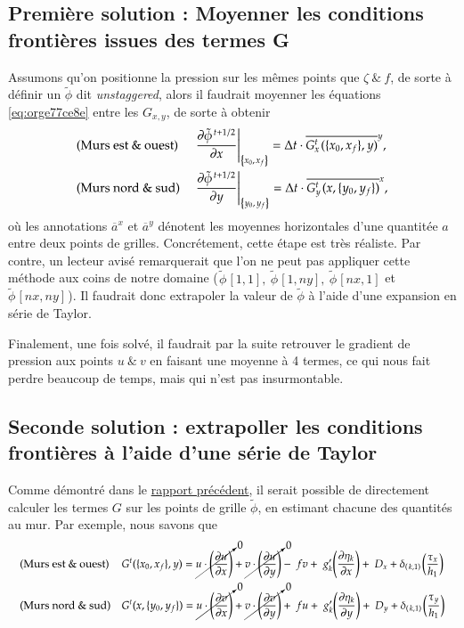 \documentclass[10pt]{article}
\numberwithin{equation}{section}
\newcommand{\pt}{\hspace{1pt}}
\newcommand{\xmean}[1]{\overline{#1}^x}
\newcommand{\ymean}[1]{\overline{#1}^y}
\begin{document}
\subsection{Première solution : Moyenner les conditions frontières issues des termes G}
\label{sec:orge65a8a8}

Assumons qu'on positionne la pression sur les mêmes points que \(\zeta\ \& \ f\), de sorte à définir un \(\tilde{\phi}\) dit \emph{unstaggered}, alors il faudrait moyenner les équations \ref{eq:orge77ce8e} entre les \(G_{x,y}\), de sorte à obtenir
\begin{subequations}
\label{eq:orgf10a900}
\begin{align}
&& &\text{(Murs est \& ouest)}
&&\eval{\pdv{\tilde{\phi}^{\pt t+1/2}}{x}}_\qty{x_0,\pt x_f}
= \Delta t\cdot \ymean{G^t_x\pt (\{x_0,x_f\},y)},&&\\
&& &\text{(Murs nord \& sud)}
&&\eval{\pdv{\tilde{\phi}^{\pt t+1/2}}{y}}_\qty{y_0,\pt y_f}
=  \Delta t\cdot \xmean{G^t_y\pt (x,\{y_0,y_f\})},&&
\end{align}
\end{subequations}
où les annotations \(\xmean{a}\) et \(\ymean{a}\) dénotent les moyennes horizontales d'une quantitée \(a\) entre deux points de grilles.
Concrétement, cette étape est très réaliste.
Par contre, un lecteur avisé remarquerait que l'on ne peut pas appliquer cette méthode aux coins de notre domaine (\(\pt \tilde{\phi}\pt[1,1],\ \tilde{\phi}\pt[1,ny],\ \tilde{\phi}\pt[nx,1]\) et \(\tilde{\phi}\pt[nx,ny]\pt\)).
Il faudrait donc extrapoler la valeur de \(\tilde{\phi}\) à l'aide d'une expansion en série de Taylor.\bigskip

Finalement, une fois solvé, il faudrait par la suite retrouver le gradient de pression aux points \(u\ \&\ v\) en faisant une moyenne à 4 termes, ce qui nous fait perdre beaucoup de temps, mais qui n'est pas insurmontable.

\subsection{Seconde solution : extrapoller les conditions frontières à l'aide d'une série de Taylor}
\label{sec:org4625298}
Comme démontré dans le \href{rapport-2023-04-21.org}{rapport précédent}, il serait possible de directement calculer les termes \(G\) sur les points de grille \(\tilde{\phi}\), en estimant chacune des quantités au mur.
Par exemple, nous savons que 
\begin{subequations}
\begin{align}
&& &\text{(Murs est \& ouest)}&&
G^t(\{x_0,x_f\},y) =
\cancelto{0}{u \cdot \qty(\pdv{u}{x})} + \cancelto{0}{v \cdot \qty(\pdv{u}{y})}
-\ fv
+\ g'_{k} \qty(\pdv{\eta_k}{x})
+\ D_x
+\delta_\qty(\pt k,1)\pt \qty(\frac{\tau_x}{h_1})&&\\
%
&& &\text{(Murs nord \& sud)} &&
G^t(x,\{y_0,y_f\}) =
\cancelto{0}{u \cdot \qty(\pdv{v}{x})} + \cancelto{0}{v \cdot \qty(\pdv{v}{y})}
+\ fu
+\ g'_{k} \qty(\pdv{\eta_k}{y})
+\ D_y
+\delta_\qty(\pt k,1)\pt \qty(\frac{\tau_y}{h_1})&&
\end{align}
\end{subequations}
\end{document}
